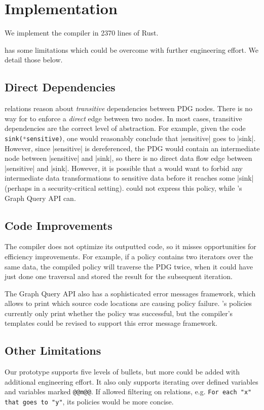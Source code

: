 \chapter{Implementation}
\label{sec:limitations}
We implement the \syslang{} compiler in 2370 lines of Rust.

\syslang{} has some limitations which could be overcome with further engineering effort.
%
We detail those below.

\section{Direct Dependencies}
\syslang{} relations reason about \emph{transitive} dependencies between PDG nodes.
%
There is no way for \ces{} to enforce a \emph{direct} edge between two nodes.
%
In most cases, transitive dependencies are the correct level of abstraction.
%
For example, given the code \lstinline[language=Rust]|sink(*sensitive)|,
one would reasonably conclude that |sensitive| goes to |sink|.
%
However, since |sensitive| is dereferenced, the PDG would contain an intermediate node between |sensitive| and |sink|,
so there is no direct data flow edge between |sensitive| and |sink|.
%
However, it is possible that a \dev{} would want to forbid any intermediate data transformations
to sensitive data before it reaches some |sink| (perhaps in a security-critical setting).
%
\syslang{} could not express this policy, while \sys{}'s Graph Query API can.

\section{Code Improvements}
The \syslang{} compiler does not optimize its outputted code, so it misses opportunities for efficiency improvements.
%
For example, if a policy contains two iterators over the same data, the \syslang{} compiled policy will traverse the PDG twice,
when it could have just done one traversal and stored the result for the subsequent iteration.

The Graph Query API also has a sophisticated error messages framework,
which allows \devs{} to print which source code locations are causing policy failure.
%
\syslang{}'s policies currently only print whether the policy was successful,
but the compiler's templates could be revised to support this error message framework.
%

\section{Other Limitations}
Our \syslang{} prototype supports five levels of bullets, but more could be added with additional engineering effort.
%
It also only supports iterating over defined variables and variables marked \lstinline[language=CNL]|@@m@@|.
%
If \syslang{} allowed filtering on relations, e.g. \lstinline[language=CNL]|For each "x" that goes to "y"|,
its policies would be more concise.
